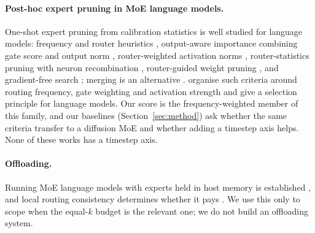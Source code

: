 \paragraph{Post-hoc expert pruning in MoE language models.}
One-shot expert pruning from calibration statistics is well studied for language models: frequency and router heuristics \citep{lu2024notallexperts}, output-aware importance combining gate score and output norm \citep{dong2025easyep}, router-weighted activation norms \citep{lasby2025reap}, router-statistics pruning with neuron recombination \citep{zhou2025dern}, router-guided weight pruning \citep{xie2024moepruner}, and gradient-free search \citep{liu2024eep}; merging is an alternative \citep{jha2026ream}.
\citet{liu2026scoreexperts} organise such criteria around routing frequency, gate weighting and activation strength and give a selection principle for language models.
Our score is the frequency-weighted member of this family, and our baselines (Section~\ref{sec:method}) ask whether the same criteria transfer to a diffusion MoE and whether adding a timestep axis helps. None of these works has a timestep axis.

\paragraph{Offloading.}
Running MoE language models with experts held in host memory is established \citep{eliseev2023offloading}, and local routing consistency determines whether it pays \citep{liang2026localrouting}.
We use this only to scope when the equal-$k$ budget is the relevant one; we do not build an offloading system.
